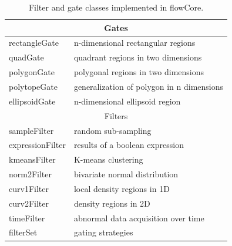 \documentclass[12pt]{article}
\newcommand{\Rpackage}[1]{{\textsf{#1}}}
\begin{document}
\begin{table}[ht]
\begin{center}
\begin{tabular}{|l|l|}
\hline
\multicolumn{2}{|c|}{Gates} \\
\hline
rectangleGate & n-dimensional rectangular regions \\
quadGate & quadrant regions in two dimensions \\
polygonGate & polygonal regions in two dimensions \\
polytopeGate & generalization of polygon in n dimensions \\
ellipsoidGate & n-dimensional ellipsoid region \\
\hline
\multicolumn{2}{|c|}{Filters} \\
\hline
sampleFilter & random sub-sampling\\
expressionFilter & results of a boolean expression \\
kmeansFilter & K-means clustering \\
norm2Filter & bivariate normal distribution \\
curv1Filter & local density regions in 1D \\
curv2Filter & density regions in 2D \\
timeFilter & abnormal data acquisition over time \\
\hline
filterSet & gating strategies \\
\hline
\end{tabular}
\caption{\label{table2}Filter and gate classes implemented in
  \Rpackage{flowCore}.}
\end{center}
\end{table}
\end{document}
